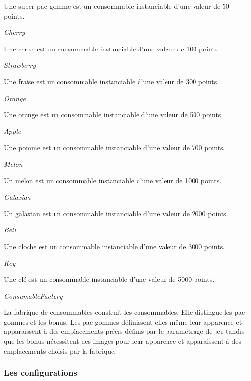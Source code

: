 \documentclass{article}
\begin{document}
Une super pac-gomme est un consommable instanciable d'une valeur de 50 points.

\medskip

\textit{Cherry}

Une cerise est un consommable instanciable d'une valeur de 100 points.

\medskip

\textit{Strawberry}

Une fraise est un consommable instanciable d'une valeur de 300 points.

\medskip

\textit{Orange}

Une orange est un consommable instanciable d'une valeur de 500 points.

\medskip

\textit{Apple}

Une pomme est un consommable instanciable d'une valeur de 700 points.

\medskip

\textit{Melon}

Un melon est un consommable instanciable d'une valeur de 1000 points.

\medskip

\textit{Galaxian}

Un galaxian est un consommable instanciable d'une valeur de 2000 points.

\medskip

\textit{Bell}

Une cloche est un consommable instanciable d'une valeur de 3000 points.

\medskip

\textit{Key}

Une clé est un consommable instanciable d'une valeur de 5000 points.

\medskip

\textit{ConsumableFactory}

La fabrique de consommables construit les consommables. Elle distingue les pac-gommes et les bonus. Les pac-gommes définissent elles-même leur apparence et apparaissent à des emplacements précis définis par le paramétrage de jeu tandis que les bonus nécessitent des images pour leur apparence et apparaissent à des emplacements choisis par la fabrique.

\subsubsection{Les configurations}
\end{document}
